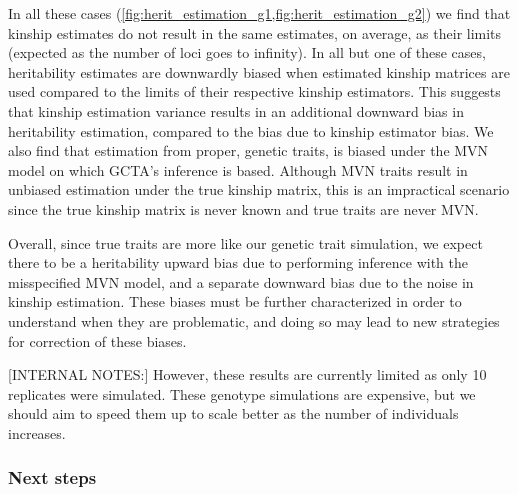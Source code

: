 \documentclass[11pt]{article}
\begin{document}
In all these cases (\cref{fig:herit_estimation_g1,fig:herit_estimation_g2}) we find that kinship estimates do not result in the same estimates, on average, as their limits (expected as the number of loci goes to infinity).
In all but one of these cases, heritability estimates are downwardly biased when estimated kinship matrices are used compared to the limits of their respective kinship estimators.
This suggests that kinship estimation variance results in an additional downward bias in heritability estimation, compared to the bias due to kinship estimator bias.
We also find that estimation from proper, genetic traits, is biased under the MVN model on which GCTA's inference is based.
Although MVN traits result in unbiased estimation under the true kinship matrix, this is an impractical scenario since the true kinship matrix is never known and true traits are never MVN.

Overall, since true traits are more like our genetic trait simulation, we expect there to be a heritability upward bias due to performing inference with the misspecified MVN model, and a separate downward bias due to the noise in kinship estimation.
These biases must be further characterized in order to understand when they are problematic, and doing so may lead to new strategies for correction of these biases.

[INTERNAL NOTES:]
However, these results are currently limited as only 10 replicates were simulated.
These genotype simulations are expensive, but we should aim to speed them up to scale better as the number of individuals increases.

\subsubsection{Next steps}
\end{document}
